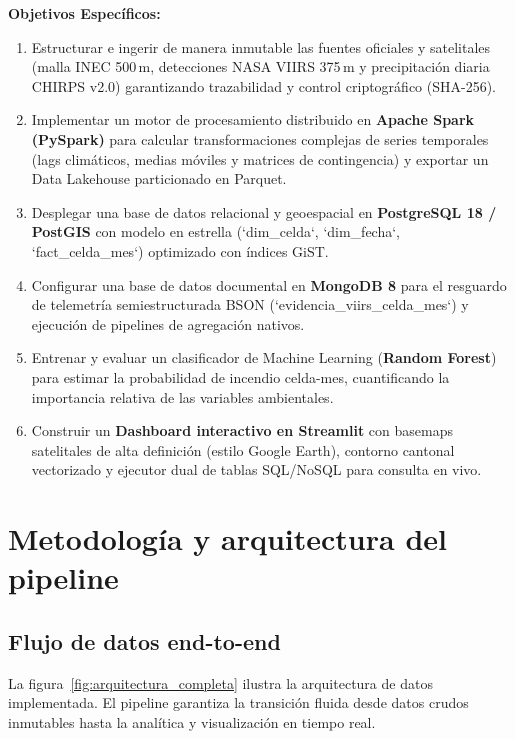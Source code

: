 \documentclass[11pt,a4paper]{article}
\begin{document}
\textbf{Objetivos Espec\'ificos:}
\begin{enumerate}
    \item Estructurar e ingerir de manera inmutable las fuentes oficiales y satelitales (malla INEC 500\,m, detecciones NASA VIIRS 375\,m y precipitaci\'on diaria CHIRPS v2.0) garantizando trazabilidad y control criptogr\'afico (SHA-256).
    \item Implementar un motor de procesamiento distribuido en \textbf{Apache Spark (PySpark)} para calcular transformaciones complejas de series temporales (lags clim\'aticos, medias m\'oviles y matrices de contingencia) y exportar un Data Lakehouse particionado en Parquet.
    \item Desplegar una base de datos relacional y geoespacial en \textbf{PostgreSQL 18 / PostGIS} con modelo en estrella (`dim\_celda`, `dim\_fecha`, `fact\_celda\_mes`) optimizado con \'indices GiST.
    \item Configurar una base de datos documental en \textbf{MongoDB 8} para el resguardo de telemetr\'ia semiestructurada BSON (`evidencia\_viirs\_celda\_mes`) y ejecuci\'on de pipelines de agregaci\'on nativos.
    \item Entrenar y evaluar un clasificador de Machine Learning (\textbf{Random Forest}) para estimar la probabilidad de incendio celda-mes, cuantificando la importancia relativa de las variables ambientales.
    \item Construir un \textbf{Dashboard interactivo en Streamlit} con basemaps satelitales de alta definici\'on (estilo Google Earth), contorno cantonal vectorizado y ejecutor dual de tablas SQL/NoSQL para consulta en vivo.
\end{enumerate}

\section{Metodolog\'ia y arquitectura del pipeline}

\subsection{Flujo de datos end-to-end}
La figura~\ref{fig:arquitectura_completa} ilustra la arquitectura de datos implementada. El pipeline garantiza la transici\'on fluida desde datos crudos inmutables hasta la anal\'itica y visualizaci\'on en tiempo real.
\end{document}
